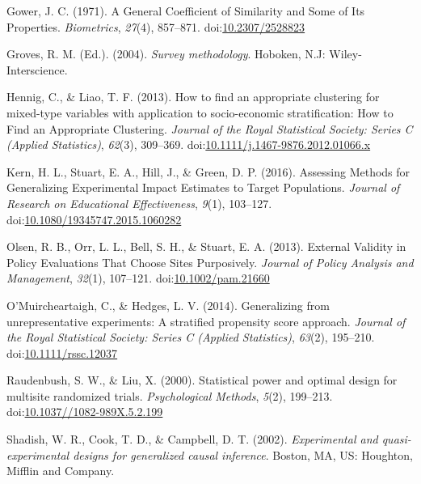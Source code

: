 \documentclass[man,floatsintext]{apa6}
\begin{document}
\leavevmode\hypertarget{ref-gowerGeneralCoefficientSimilarity1971}{}%
Gower, J. C. (1971). A General Coefficient of Similarity and Some of Its Properties. \emph{Biometrics}, \emph{27}(4), 857--871. doi:\href{https://doi.org/10.2307/2528823}{10.2307/2528823}

\leavevmode\hypertarget{ref-grovesSurveyMethodology2004}{}%
Groves, R. M. (Ed.). (2004). \emph{Survey methodology}. Hoboken, N.J: Wiley-Interscience.

\leavevmode\hypertarget{ref-hennigHowFindAppropriate2013}{}%
Hennig, C., \& Liao, T. F. (2013). How to find an appropriate clustering for mixed-type variables with application to socio-economic stratification: How to Find an Appropriate Clustering. \emph{Journal of the Royal Statistical Society: Series C (Applied Statistics)}, \emph{62}(3), 309--369. doi:\href{https://doi.org/10.1111/j.1467-9876.2012.01066.x}{10.1111/j.1467-9876.2012.01066.x}

\leavevmode\hypertarget{ref-kernAssessingMethodsGeneralizing2016}{}%
Kern, H. L., Stuart, E. A., Hill, J., \& Green, D. P. (2016). Assessing Methods for Generalizing Experimental Impact Estimates to Target Populations. \emph{Journal of Research on Educational Effectiveness}, \emph{9}(1), 103--127. doi:\href{https://doi.org/10.1080/19345747.2015.1060282}{10.1080/19345747.2015.1060282}

\leavevmode\hypertarget{ref-olsenExternalValidityPolicy2013}{}%
Olsen, R. B., Orr, L. L., Bell, S. H., \& Stuart, E. A. (2013). External Validity in Policy Evaluations That Choose Sites Purposively. \emph{Journal of Policy Analysis and Management}, \emph{32}(1), 107--121. doi:\href{https://doi.org/10.1002/pam.21660}{10.1002/pam.21660}

\leavevmode\hypertarget{ref-omuircheartaighGeneralizingUnrepresentativeExperiments2014}{}%
O'Muircheartaigh, C., \& Hedges, L. V. (2014). Generalizing from unrepresentative experiments: A stratified propensity score approach. \emph{Journal of the Royal Statistical Society: Series C (Applied Statistics)}, \emph{63}(2), 195--210. doi:\href{https://doi.org/10.1111/rssc.12037}{10.1111/rssc.12037}

\leavevmode\hypertarget{ref-raudenbushStatisticalPowerOptimal2000}{}%
Raudenbush, S. W., \& Liu, X. (2000). Statistical power and optimal design for multisite randomized trials. \emph{Psychological Methods}, \emph{5}(2), 199--213. doi:\href{https://doi.org/10.1037//1082-989X.5.2.199}{10.1037//1082-989X.5.2.199}

\leavevmode\hypertarget{ref-shadishExperimentalQuasiexperimentalDesigns2002}{}%
Shadish, W. R., Cook, T. D., \& Campbell, D. T. (2002). \emph{Experimental and quasi-experimental designs for generalized causal inference}. Boston, MA, US: Houghton, Mifflin and Company.
\end{document}
